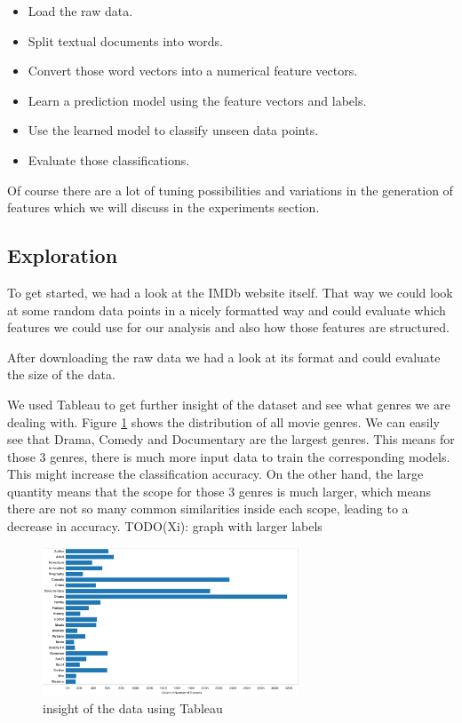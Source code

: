 \documentclass{vldb}
\begin{document}
\begin{itemize}
\item {Load the raw data.}
\item {Split textual documents into words.}
\item {Convert those word vectors into a numerical feature vectors.}
\item {Learn a prediction model using the feature vectors and labels.}
\item {Use the learned model to classify unseen data points.}
\item {Evaluate those classifications.}
\end{itemize}

\par Of course there are a lot of tuning possibilities and variations in the generation of features which we will discuss in the experiments section.

\subsection{Exploration}
\par To get started, we had a look at the IMDb website itself. That way we could look at some random data points in a nicely formatted way and could evaluate which features we could use for our analysis and also how those features are structured. 
\par After downloading the raw data we had a look at its format and could evaluate the size of the data.
\par We used Tableau to get further insight of the dataset and see what genres we are dealing with. Figure \ref{fig:tableau} shows the distribution of all movie genres. We can easily see that Drama, Comedy and Documentary are the largest genres. This means for those 3 genres, there is much more input data to train the corresponding models. This might increase the classification accuracy. On the other hand, the large quantity means that the scope for those 3 genres is much larger, which means there are not so many common similarities inside each scope, leading to a decrease in accuracy.
TODO(Xi): graph with larger labels
\begin{figure}
\begin{center}
\includegraphics[width=3.00in]{genresContribution.png}
\caption{insight of the data using Tableau}
\label{fig:tableau}
\end{center}
\end{figure} 
\end{document}
